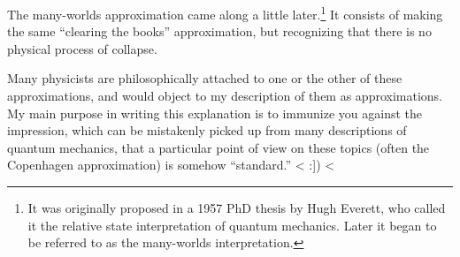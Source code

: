 The many-worlds approximation came along a little later.\footnote{It was
originally proposed in a 1957 PhD thesis by Hugh Everett, who called it
the relative state interpretation of quantum mechanics. Later it began
to be referred to as the many-worlds interpretation.} It consists of
making the same ``clearing the books'' approximation, but recognizing
that there is no physical process of collapse. 

Many physicists are philosophically attached to one or the other of these
approximations, and would object to my description of them as approximations.
My main purpose in writing this explanation is to immunize you against the
impression, which can be mistakenly picked up from many descriptions of quantum
mechanics, that a particular point of view on these topics (often the Copenhagen
approximation) is somehow ``standard.''
<%
:]) 
<%
